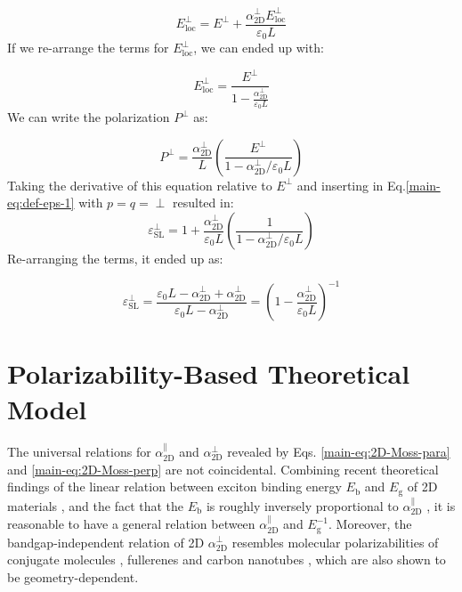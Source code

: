 \documentclass[journal=ancac3,email=true,hyperref=true,keywords=false]{achemso}
\begin{document}
\begin{equation}
{E}_{\mathrm{loc}}^{\perp}={E}^{\perp}+\frac{\alpha^{\perp}_{\mathrm{2D}} {E}_{\mathrm{loc}}^{\perp}}{\varepsilon_0 L}
\end{equation}
%
If we re-arrange the terms for ${E}_{\mathrm{loc}}^{\perp}$, we can ended up with:  

\begin{equation}
{E}_{\mathrm{loc}}^{\perp}= \frac{{E}^{\perp}}{ 1-\frac{\alpha^{\perp}_{\mathrm{2D}}}{\varepsilon_0 L} }
\end{equation}
%
We can write the polarization ${P}^{\perp}$ as: 

\begin{equation}
{P}^{\perp} = \frac{\alpha^{\perp}_{\mathrm{2D}}} {L}(\frac{{E}^{\perp}} {1-\alpha^{\perp}_{\mathrm{2D}}/\varepsilon_0 L})
\end{equation} 
%
%
Taking the derivative of this equation relative to ${E}^{\perp}$ and inserting in Eq.\ref{main-eq:def-eps-1} with $p=q=\perp$ resulted in: 
%
\begin{equation}
\varepsilon_{\mathrm{SL}}^{\perp} = 1 +  \frac{\alpha^{\perp}_{\mathrm{2D}}} {\varepsilon_0 L}(\frac{1} {1-\alpha^{\perp}_{\mathrm{2D}}/\varepsilon_0 L})
\end{equation}
%
Re-arranging the terms, it ended up as: 

\begin{equation}
\varepsilon_{\mathrm{SL}}^{\perp} =\frac{\varepsilon_0 L - \alpha^{\perp}_{\mathrm{2D}} + \alpha^{\perp}_{\mathrm{2D}}}{  \varepsilon_0 L - \alpha^{\perp}_{\mathrm{2D}}} = (1 - \frac{\alpha_{\mathrm{2D}}^{\perp}}{\varepsilon_0 L})^{-1} 
\end{equation}



\section{Polarizability-Based Theoretical Model}
\label{sec:theory-1}
%
%
The universal relations for $\alpha_{\mathrm{2D}}^{\parallel}$ and
$\alpha_{\mathrm{2D}}^{\perp}$ revealed by 
Eqs. \ref{main-eq:2D-Moss-para} and \ref{main-eq:2D-Moss-perp} are not
coincidental. Combining recent theoretical findings of the linear
relation between exciton binding energy $E_{\mathrm{b}}$ and
$E_{\mathrm{g}}$ of 2D materials
\cite{Choi_linear_2015,Olsen_2016_hydrogen,Jiang_2017_Eg_Eb}, and the
fact that the $E_{\mathrm{b}}$ is roughly inversely proportional to
$\alpha_{\mathrm{2D}}^{\parallel}$ \cite{Pulci_2014}, it is reasonable
to have a general relation between
$\alpha_{\mathrm{2D}}^{\parallel}$ and $E_{\mathrm{g}}^{-1}$. Moreover,
the bandgap-independent relation of 2D $\alpha_{\mathrm{2D}}^{\perp}$
resembles molecular polarizabilities of conjugate molecules
\cite{Davies_1952}, fullerenes \cite{Sabirov_2014} and carbon
nanotubes \cite{Benedict_1995}, which are also shown to be
geometry-dependent.
\end{document}
